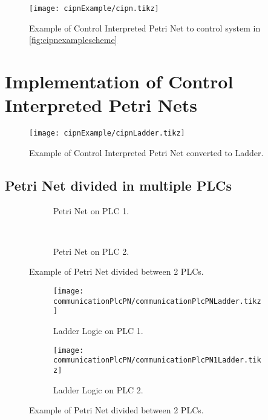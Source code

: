\pagebreak
\begin{figure}[H]
  \centering
  \texttt{[image: cipnExample/cipn.tikz]}
  \caption[cipnexample]{Example of Control Interpreted Petri Net to control
    system in \autoref{fig:cipnexamplescheme}}
  \label{fig:cipnexample}
\end{figure}



\usetikzlibrary{arrows,shapes,circuits.plc.ladder,external}

\section{Implementation of Control Interpreted Petri Nets}
\label{sec:implementPetriNets}
\begin{figure}[H]
  \centering
  \texttt{[image: cipnExample/cipnLadder.tikz]}
  \caption[cipnexample]{Example of Control Interpreted Petri Net converted to Ladder.}
  \label{fig:cipnexampleLadder}
\end{figure}


\subsection{Petri Net divided in multiple PLCs}
\label{sec:multiplePlcs}

\begin{figure}[H]
    \centering
    \begin{subfigure}[t]{0.5\textwidth}
      \centering
        \caption{Petri Net on PLC 1.}
        \label{fig:communicationPlcPN}
    \end{subfigure}%
    ~ 
    \begin{subfigure}[t]{0.5\textwidth}
        \centering
  \caption{Petri Net on PLC 2.}
  \label{fig:communicationPlcPN1}
    \end{subfigure}
    \caption{Example of Petri Net divided between 2 PLCs.}
\end{figure}


\begin{figure}[H]
    \centering
    \begin{subfigure}[t]{0.45\textwidth}
        \centering
        \texttt{[image: communicationPlcPN/communicationPlcPNLadder.tikz]}
        \caption{Ladder Logic on PLC 1.}
        \label{fig:communicationPlcPN}
    \end{subfigure}%
\hfill
    \begin{subfigure}[t]{0.45\textwidth}
        \centering
        \texttt{[image: communicationPlcPN/communicationPlcPN1Ladder.tikz]}
  \caption{Ladder Logic on PLC 2.}
  \label{fig:communicationPlcPN1}
    \end{subfigure}
    \caption{Example of Petri Net divided between 2 PLCs.}
\end{figure}
  

